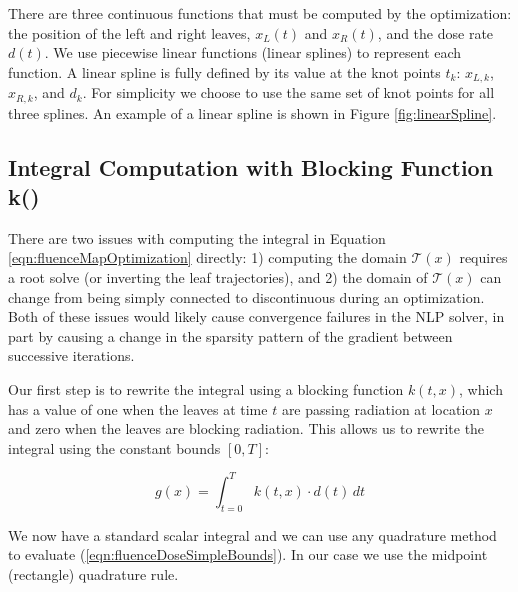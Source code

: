 \documentclass{iopart}
\begin{document}
There are three continuous functions that must be computed by the optimization: the position of the left and right leaves, $x_L(t)$ and $x_R(t)$, and the dose rate $d(t)$. We use piecewise linear functions (linear splines) to represent each function. A linear spline is fully defined by its value at the knot points $t_k$: $x_{L,k}$, $x_{R,k}$, and $d_k$. For simplicity we choose to use the same set of knot points for all three splines. An example of a linear spline is shown in Figure \ref{fig:linearSpline}.



\subsection{Integral Computation with Blocking Function k()}
\label{sec:IntegralComputationWithBlockingFunction}

There are two issues with computing the integral in Equation \ref{eqn:fluenceMapOptimization} directly: 1) computing the domain $\mathcal{T}(x)$ requires a root solve (or inverting the leaf trajectories), and 2) the domain of $\mathcal{T}(x)$ can change from being simply connected to discontinuous during an optimization. Both of these issues would likely cause convergence failures in the NLP solver, in part by causing a change in the sparsity pattern of the gradient
between successive iterations.

Our first step is to rewrite the integral using a blocking function $k(t,x)$, which has a value of one when the leaves at time $t$ are passing radiation at location $x$ and zero when the leaves are blocking radiation. This allows us to rewrite the integral using the constant bounds $[0, T]$:

\begin{equation}
  g(x) = \int_{t=0}^T \! k(t, x) \cdot d(t) \, dt
  \label{eqn:fluenceDoseSimpleBounds}
\end{equation}

We now have a standard scalar integral and we can use any quadrature method to evaluate (\ref{eqn:fluenceDoseSimpleBounds}).
In our case we use the midpoint (rectangle) quadrature rule.
\end{document}
